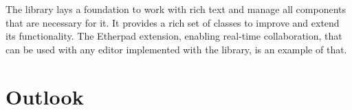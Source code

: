 The library lays a foundation to work with rich text and manage all components that are necessary for it. It provides a rich set of classes to improve and extend its functionality. The Etherpad extension, enabling real-time collaboration, that can be used with any editor implemented with the library, is an example of that.







\chapter{Outlook}

